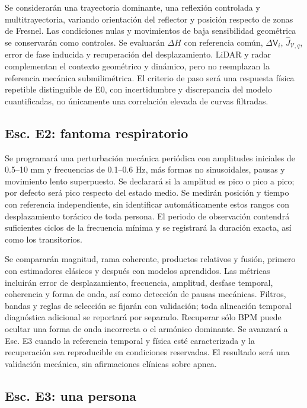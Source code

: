 Se considerarán una trayectoria dominante, una reflexión controlada y multitrayectoria,
variando orientación del reflector y posición respecto de zonas de Fresnel. Las
condiciones nulas y movimientos de baja sensibilidad geométrica se conservarán como
controles. Se evaluarán $\Delta H$ con referencia común, $\Delta\mathsf V_i$,
$\widehat J_{\mathcal V,q}$, error de fase inducida y recuperación del desplazamiento.
LiDAR y radar complementan el contexto geométrico y dinámico, pero no reemplazan
la referencia mecánica submilimétrica. El criterio de paso será una respuesta física
repetible distinguible de E0, con incertidumbre y discrepancia del modelo cuantificadas,
no únicamente una correlación elevada de curvas filtradas.

\subsection{Esc. E2: fantoma respiratorio}
\label{sec:scenario_e2}

Se programará una perturbación mecánica periódica con amplitudes iniciales de
0.5--10 mm y frecuencias de 0.1--0.6 Hz, más formas no sinusoidales, pausas y
movimiento lento superpuesto. Se declarará si la amplitud es pico o pico a pico;
por defecto será pico respecto del estado medio. Se medirán posición y tiempo con
referencia independiente, sin identificar automáticamente estos rangos con desplazamiento
torácico de toda persona. El periodo de observación contendrá suficientes ciclos de
la frecuencia mínima y se registrará la duración exacta, así como los transitorios.

Se compararán magnitud, rama coherente, productos relativos y fusión, primero con
estimadores clásicos y después con modelos aprendidos. Las métricas incluirán error
de desplazamiento, frecuencia, amplitud, desfase temporal, coherencia y forma de onda,
así como detección de pausas mecánicas. Filtros, bandas y reglas de selección se fijarán
con validación; toda alineación temporal diagnóstica adicional se reportará por separado.
Recuperar sólo BPM puede ocultar una forma de onda incorrecta o el armónico dominante.
Se avanzará a Esc. E3 cuando la referencia temporal y física esté caracterizada y
la recuperación sea reproducible en condiciones reservadas. El resultado será una
validación mecánica, sin afirmaciones clínicas sobre apnea.

\subsection{Esc. E3: una persona}
\label{sec:scenario_e3}

